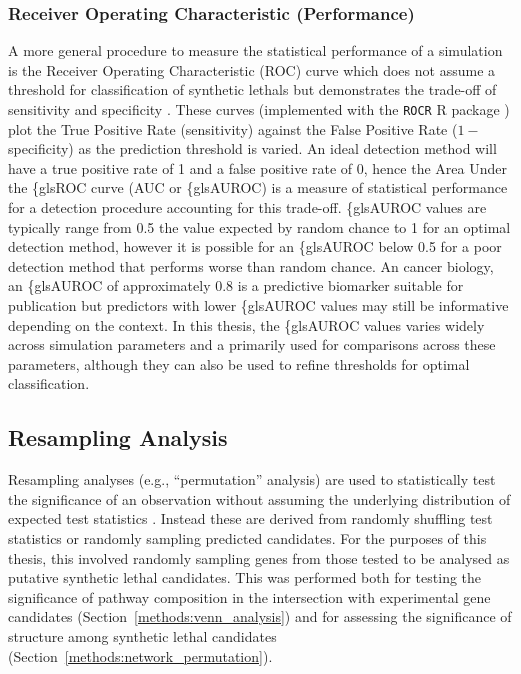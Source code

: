 \subsubsection{Receiver Operating Characteristic (Performance)}
A more general procedure to measure the statistical performance of a simulation is the Receiver Operating Characteristic (ROC) curve which does not assume a threshold for classification of \glspl{synthetic lethal} but demonstrates the trade-off of sensitivity and specificity \citep{Zweig1993, Fawcett2006, Akobeng2007}. These curves (implemented with the \texttt{ROCR} R package \citep{ROCR}) plot the True Positive Rate (sensitivity) against the False Positive Rate ($1-$specificity) as the prediction threshold is varied. An ideal detection method will have a true positive rate of 1 and a false positive rate of 0, hence the Area Under the \{gls{ROC} curve (AUC or \{gls{AUROC}) is a measure of statistical performance for a detection procedure accounting for this trade-off. \{gls{AUROC} values are typically range from 0.5 the value expected by random chance to 1 for an optimal detection method, however it is possible for an \{gls{AUROC} below 0.5 for a poor detection method that performs worse than random chance. An cancer biology, an \{gls{AUROC} of approximately $0.8$ is a predictive biomarker suitable for publication \citep{Hajian-Tilaki2013} but predictors with lower \{gls{AUROC} values may still be informative depending on the context. In this thesis, the \{gls{AUROC} values varies widely across simulation parameters and a primarily used for comparisons across these parameters, although they can also be used to refine thresholds for optimal classification. 

\subsection{Resampling Analysis} \label{methods:permutation}
Resampling analyses (e.g., ``permutation'' analysis) are used to statistically test the significance of an observation without assuming the underlying distribution of expected test statistics \citet{Collingridge2013}. Instead these are derived from randomly shuffling test statistics or randomly sampling predicted candidates. For the purposes of this thesis, this involved randomly sampling genes from those tested to be analysed as putative \gls{synthetic lethal} candidates. This was performed both for testing the significance of \gls{pathway} composition in the intersection with experimental gene candidates (Section~\ref{methods:venn_analysis}) and for assessing the significance of  structure among \gls{synthetic lethal} candidates (Section~\ref{methods:network_permutation}).


